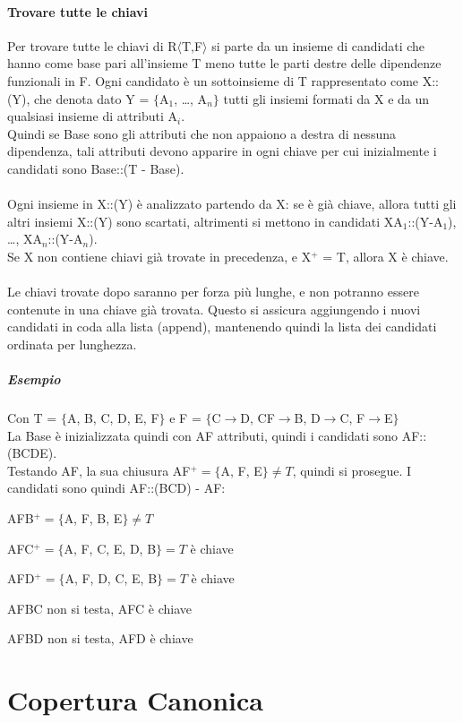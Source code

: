 \documentclass[10pt]{book}
\begin{document}
\paragraph{Trovare tutte le chiavi} Per trovare tutte le chiavi di R$\langle$T,F$\rangle$ si parte da un insieme di candidati che hanno come base pari all'insieme T meno tutte le parti destre delle dipendenze funzionali in F. Ogni candidato è un sottoinsieme di T rappresentato come X::(Y), che denota dato Y = $\{$A$_1$, \ldots, A$_n\}$ tutti gli insiemi formati da X e da un qualsiasi insieme di attributi A$_i$.\\
Quindi se Base sono gli attributi che non appaiono a destra di nessuna dipendenza, tali attributi devono apparire in ogni chiave per cui inizialmente i candidati sono Base::(T - Base).\\\\
Ogni insieme in X::(Y) è analizzato partendo da X: se è già chiave, allora tutti gli altri insiemi X::(Y) sono scartati, altrimenti si mettono in candidati XA$_1$::(Y-A$_1$), \ldots, XA$_n$::(Y-A$_n$).\\
Se X non contiene chiavi già trovate in precedenza, e X$^+$ = T, allora X è chiave.\\\\
Le chiavi trovate dopo saranno per forza più lunghe, e non potranno essere contenute in una chiave già trovata. Questo si assicura aggiungendo i nuovi candidati in coda alla lista (append), mantenendo quindi la lista dei candidati ordinata per lunghezza.
\subparagraph{Esempio} Con T = $\{$A, B, C, D, E, F$\}$ e F = $\{$C$\rightarrow$D, CF$\rightarrow$B, D$\rightarrow$C, F$\rightarrow$E$\}$\\
La Base è inizializzata quindi con AF attributi, quindi i candidati sono AF::(BCDE).\\
Testando AF, la sua chiusura AF$^+ = \{$A, F, E$\}\neq T$, quindi si prosegue. I candidati sono quindi AF::(BCD) - AF:
\begin{list}{}{}
	\item AFB$^+ = \{$A, F, B, E$\}\neq T$
	\item AFC$^+ = \{$A, F, C, E, D, B$\} = T$ è chiave
	\item AFD$^+ = \{$A, F, D, C, E, B$\} = T$ è chiave
	\item AFBC non si testa, AFC è chiave
	\item AFBD non si testa, AFD è chiave
\end{list}
\section{Copertura Canonica}
\end{document}
